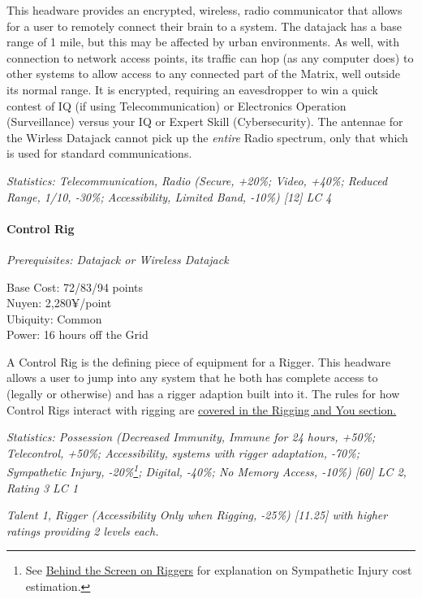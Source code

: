 \begin{multicols*}{3}
	This headware provides an encrypted, wireless, radio communicator that allows for a user to remotely connect their brain to a system. The datajack has a base range of 1 mile, but this may be affected by urban environments. As well, with connection to network access points, its traffic can hop (as any computer does) to other systems to allow access to any connected part of the Matrix, well outside its normal range. It is encrypted, requiring an eavesdropper to win a quick contest of IQ (if using Telecommunication) or Electronics Operation (Surveillance) versus your IQ or Expert Skill (Cybersecurity). The antennae for the Wirless Datajack cannot pick up the \textit{entire} Radio spectrum, only that which is used for standard communications.
	
	\textit{\textcolor{OliveGreen}{Statistics: Telecommunication, Radio (Secure, +20\%; Video, +40\%; Reduced Range, 1/10, -30\%; Accessibility, Limited Band, -10\%) [12] LC 4}}
	
	\paragraph{Control Rig}\label{control_rig}
	\textit{Prerequisites: Datajack or Wireless Datajack}
	\begin{flushright}
		Base Cost: 72/83/94 points\\
		Nuyen: 2,280¥/point\\
		Ubiquity: Common\\
		Power: 16 hours off the Grid\\
	\end{flushright}
	
	A Control Rig is the defining piece of equipment for a Rigger. This headware allows a user to jump into any system that he both has complete access to (legally or otherwise) and has a rigger adaption built into it. The rules for how Control Rigs interact with rigging are \hyperref[riggers]{covered in the Rigging and You section.}
	
	\textit{\textcolor{OliveGreen}{Statistics: Possession (Decreased Immunity, Immune for 24 hours, +50\%; Telecontrol, +50\%; Accessibility, systems with rigger adaptation, -70\%; Sympathetic Injury, -20\%\footnote{See \hyperref[bts_riggers]{Behind the Screen on Riggers} for explanation on Sympathetic Injury cost estimation.}; Digital, -40\%; No Memory Access, -10\%) [60] LC 2, Rating 3 LC 1}}
	
	\textit{\textcolor{OliveGreen}{Talent 1, Rigger (Accessibility  Only when Rigging, -25\%) [11.25] with higher ratings providing 2 levels each.}}
	

\end{multicols*}
